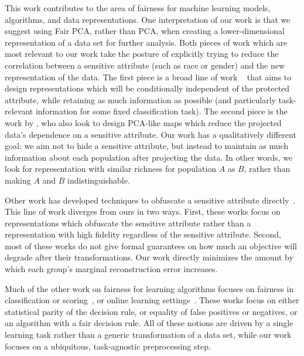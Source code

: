 \documentclass{article}
\begin{document}
This work contributes to the area of fairness for machine learning
models, algorithms, and data representations.  One interpretation of
our work is that we suggest using Fair PCA, rather than PCA, when
creating a lower-dimensional representation of a data set for further
analysis. Both pieces of work which are most relevant to our work
take the posture of explicitly trying to reduce the correlation
between a sensitive attribute 
(such as race or gender)
and the new
representation of the data.  The first piece is a broad line of
work ~\citep{representation,Beutel2017DataDA,
  calmon2017optimized,madras18a,zhang2018mitigating} that aims to design representations
which will be conditionally independent of the protected attribute,
while retaining as much information as possible (and particularly
task-relevant information for some fixed classification
task). The second piece is the work by \citet{convexpca}, who also look to design PCA-like maps which
reduce the projected data's dependence on a sensitive attribute. Our
work has a qualitatively different goal: we aim not to hide a
sensitive attribute, but instead to maintain as much information about
each population after projecting the data.  In other words, we look
for representation with similar richness for population $A$ as $B$,
rather than making $A$ and $B$ indistinguishable.

Other work has developed techniques to obfuscate a sensitive attribute
directly~\citep{PedreshiRT08,KamiranCP10,CaldersV10,KamiranC11,LuongRT11,KamiranKZ12,KamishimaAAS12,HajianD13,FeldmanFMSV15,ZafarVGG15,FishKL16,AdlerFFRSSV16}.
 This line of work diverges
from ours in two ways. First, these works focus on representations
which obfuscate the sensitive attribute rather than a representation
with high fidelity regardless of the sensitive attribute. Second, most of
these works do not give formal guarantees on how much an objective
will degrade after their transformations. Our work directly minimizes
the amount by which each group's marginal reconstruction error increases.

Much of the other work on fairness for learning algorithms focuses on
fairness in classification or scoring~\citep{fta, hardt2016,
  kleinberg2016, chouldechova2017fair}, or online learning
settings~\citep{JKMR16, KKMPRVW17, EFNSV17, ensign2017runaway}. These
works focus on either statistical parity of the decision rule, or
equality of false positives or negatives, or an algorithm with a fair
decision rule. All of these notions are driven by a single learning
task rather than a generic transformation of a data set, while our work
focuses on a ubiquitous, task-agnostic preprocessing step.
\end{document}
